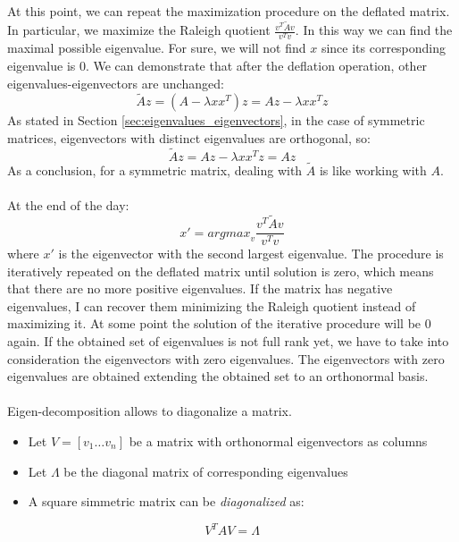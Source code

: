 \paragraph{}
At this point, we can repeat the maximization procedure on the deflated matrix. In particular, we maximize the Raleigh quotient $\frac{v^T \tilde{A} v}{v^T v}$. In this way we can find the maximal possible eigenvalue. For sure, we will not find $x$ since its corresponding eigenvalue is 0.
We can demonstrate that after the deflation operation, other eigenvalues-eigenvectors are unchanged:
\begin{equation*}
    \tilde{A}z = (A - \lambda x x^T) z = Az - \lambda x x^T z
\end{equation*}
As stated in Section \ref{sec:eigenvalues_eigenvectors}, in the case of symmetric matrices, eigenvectors with distinct eigenvalues are orthogonal, so:
\begin{equation*}
    \tilde{A}z = Az - \lambda x x^T z = Az
\end{equation*}
As a conclusion, for a symmetric matrix, dealing with $\tilde{A}$ is like working with $A$.

\paragraph{}
At the end of the day:
\begin{equation*}
    x' = \textit{argmax}_v \frac{v^T \tilde{A} v}{v^T v}
\end{equation*}
where $x'$ is the eigenvector with the second largest eigenvalue.
The procedure is iteratively repeated on the deflated matrix until solution is zero, which means that there are no more positive eigenvalues.
If the matrix has negative eigenvalues, I can recover them minimizing the Raleigh quotient instead of maximizing it.
At some point the solution of the iterative procedure will be 0 again. If the obtained set of eigenvalues is not full rank yet, we have to take into consideration the eigenvectors with zero eigenvalues. The eigenvectors with zero eigenvalues are obtained extending the obtained set to an orthonormal basis.

\paragraph{}
Eigen-decomposition allows to diagonalize a matrix.

\begin{itemize}
    \item Let $V = [v_1 \hdots v_n]$ be a matrix with orthonormal eigenvectors as columns
    
    \item Let $\Lambda$ be the diagonal matrix of corresponding eigenvalues
    
    \item A square simmetric matrix can be \textit{diagonalized} as:
\end{itemize}
\begin{equation}
    V^T A V = \Lambda
\end{equation}

